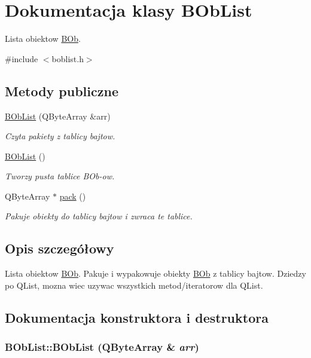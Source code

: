 \hypertarget{class_b_ob_list}{
\section{Dokumentacja klasy BObList}
\label{class_b_ob_list}
}


Lista obiektow \hyperlink{class_b_ob}{BOb}.  


{\ttfamily \#include $<$boblist.h$>$}\subsection*{Metody publiczne}
\begin{DoxyCompactItemize}
\item 
\hyperlink{class_b_ob_list_af7a55be345796f510a836c0696513f6e}{BObList} (QByteArray \&arr)
\begin{DoxyCompactList}\small\item\em Czyta pakiety z tablicy bajtow. \item\end{DoxyCompactList}\item 
\hypertarget{class_b_ob_list_afcc5319572df6cf382c1fffb15b3d10c}{
\hyperlink{class_b_ob_list_afcc5319572df6cf382c1fffb15b3d10c}{BObList} ()}
\label{class_b_ob_list_afcc5319572df6cf382c1fffb15b3d10c}

\begin{DoxyCompactList}\small\item\em Tworzy pusta tablice BOb-\/ow. \item\end{DoxyCompactList}\item 
QByteArray $\ast$ \hyperlink{class_b_ob_list_adfa68bde6e6c3c6641735fb552a76d80}{pack} ()
\begin{DoxyCompactList}\small\item\em Pakuje obiekty do tablicy bajtow i zwraca te tablice. \item\end{DoxyCompactList}\end{DoxyCompactItemize}


\subsection{Opis szczegółowy}
Lista obiektow \hyperlink{class_b_ob}{BOb}. Pakuje i wypakowuje obiekty \hyperlink{class_b_ob}{BOb} z tablicy bajtow. Dziedzy po QList, mozna wiec uzywac wszystkich metod/iteratorow dla QList. 

\subsection{Dokumentacja konstruktora i destruktora}
\hypertarget{class_b_ob_list_af7a55be345796f510a836c0696513f6e}{
\subsubsection[{BObList}]{\setlength{\rightskip}{0pt plus 5cm}BObList::BObList (QByteArray \& {\em arr})}}
\label{class_b_ob_list_af7a55be345796f510a836c0696513f6e}


